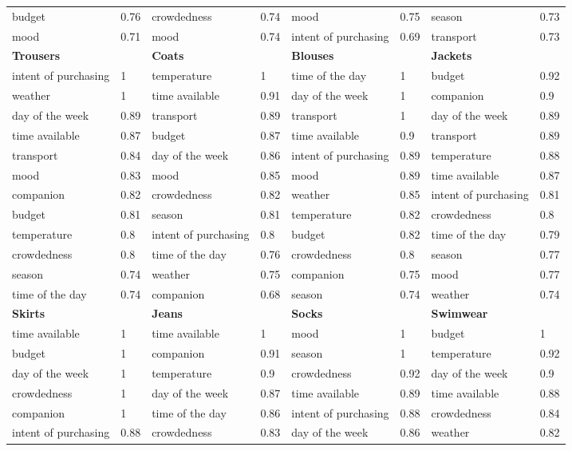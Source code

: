 \begin{center}
\begin{longtable}{p{2.2cm}p{0.5cm}p{2.2cm}p{0.5cm}p{2.2cm}p{0.5cm}p{2.3cm}p{0.5cm}}
budget & 0.76 & crowdedness & 0.74 & mood & 0.75 & season & 0.73 \\
mood & 0.71 & mood & 0.74 & intent of purchasing & 0.69 & transport & 0.73 \\ 
\hline
\textbf{Trousers} &  & \textbf{Coats} &  & \textbf{Blouses}  &  & \textbf{Jackets}\\
\hline
intent of purchasing & 1 & temperature & 1 & time of the day & 1 & budget & 0.92 \\
weather & 1 & time available & 0.91 & day of the week & 1 & companion & 0.9 \\
day of the week & 0.89 & transport & 0.89 & transport & 1 & day of the week & 0.89 \\
time available & 0.87 & budget & 0.87 & time available & 0.9 & transport & 0.89 \\
transport & 0.84 & day of the week & 0.86 & intent of purchasing & 0.89 & temperature & 0.88 \\
mood & 0.83 & mood & 0.85 & mood & 0.89 & time available & 0.87 \\
companion & 0.82 & crowdedness & 0.82 & weather & 0.85 & intent of purchasing & 0.81 \\
budget & 0.81 & season & 0.81 & temperature & 0.82 & crowdedness & 0.8 \\
temperature & 0.8 & intent of purchasing & 0.8 & budget & 0.82 & time of the day & 0.79 \\
crowdedness & 0.8 & time of the day & 0.76 & crowdedness & 0.8 & season & 0.77 \\
season & 0.74 & weather & 0.75 & companion & 0.75 & mood & 0.77 \\
time of the day & 0.74 & companion & 0.68 & season & 0.74 & weather & 0.74 \\
\hline
\textbf{Skirts} &  & \textbf{Jeans} &  & \textbf{Socks} &  & \textbf{Swimwear} \\
\hline
time available & 1 & time available & 1 & mood & 1 & budget & 1 \\
budget & 1 & companion & 0.91 & season & 1 & temperature & 0.92 \\
day of the week & 1 & temperature & 0.9 & crowdedness & 0.92 & day of the week & 0.9 \\
crowdedness & 1 & day of the week & 0.87 & time available & 0.89 & time available & 0.88 \\
companion & 1 & time of the day & 0.86 & intent of purchasing & 0.88 & crowdedness & 0.84 \\
intent of purchasing & 0.88 & crowdedness & 0.83 & day of the week & 0.86 & weather & 0.82 \\

\end{longtable}
\end{center}
